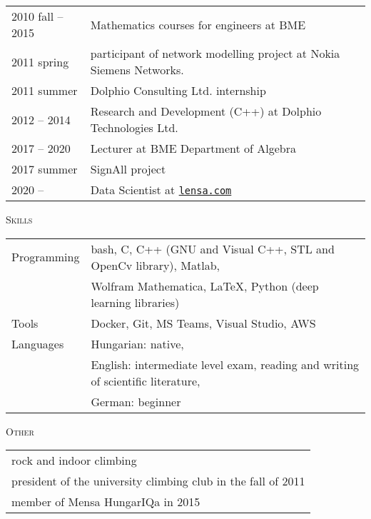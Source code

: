 \documentclass[12pt]{article}
\begin{document}
       \begin{tabular}{p{3cm}l}
	       2010 fall -- 2015 & Mathematics courses for engineers at BME\\
           2011 spring  & participant of network modelling project at Nokia Siemens Networks. \\
		   2011 summer    & Dolphio Consulting Ltd. internship\\
		   2012 -- 2014 & Research and Development (C++) at Dolphio Technologies Ltd. \\
           2017 -- 2020 & Lecturer at BME Department of Algebra \\
           2017 summer & SignAll project \\
           2020 -- & Data Scientist at \href{https://lensa.com/}{\texttt{lensa.com}}
       \end{tabular}

 \textsc{Skills}

        \begin{tabular}{>{\raggedright\arraybackslash}p{3cm}l}
	       Programming &  bash, C, C++ (GNU and Visual C++, STL and OpenCv library), Matlab, \\
             & Wolfram Mathematica, \LaTeX, Python (deep learning libraries)\\
           Tools & Docker, Git, MS Teams, Visual Studio, AWS \\
           Languages & Hungarian: native, \\
                    & English: intermediate level exam, reading and writing of scientific literature, \\
                    & German: beginner
        \end{tabular}
 
 \textsc{Other}
 
 \begin{tabular}{l}
        rock and indoor climbing\\
        president of the university climbing club in the fall of 2011\\
        member of Mensa HungarIQa in 2015
    \end{tabular}
\end{document}
